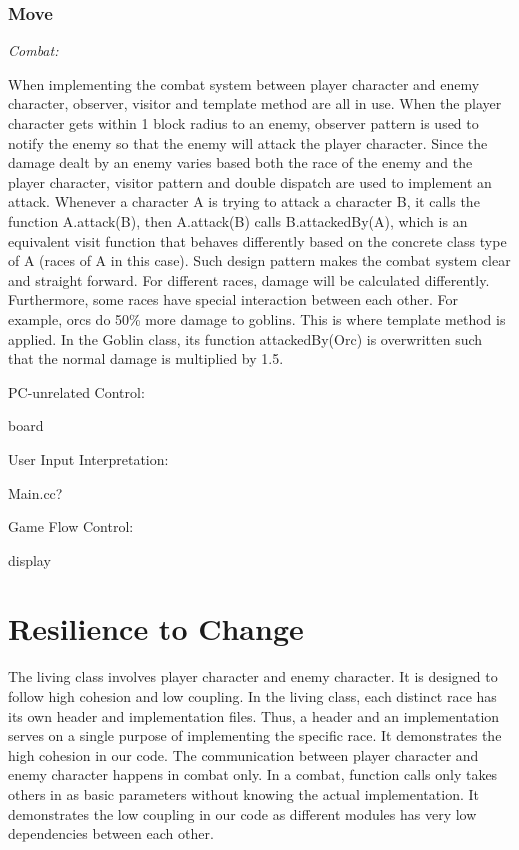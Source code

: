 \documentclass[11pt]{article}
\theoremstyle{plain} \newtheorem{theorem*}{Theorem}[subsection]
\begin{document}
\subsubsection{Move}

\textit{Combat: }

When implementing the combat system between player character and enemy
character, observer, visitor and template method are all in use. When the
player character gets within 1 block radius to an enemy, observer pattern is
used to notify the enemy so that the enemy will attack the player character.
Since the damage dealt by an enemy varies based both the race of the enemy and
the player character, visitor pattern and double dispatch are used to implement
an attack. Whenever a character A is trying to attack a character B, it calls
the function A.attack(B), then A.attack(B) calls B.attackedBy(A), which is an
equivalent visit function that behaves differently based on the concrete class
type of A (races of A in this case). Such design pattern makes the combat
system clear and straight forward. For different races, damage will be
calculated differently. Furthermore, some races have special interaction
between each other. For example, orcs do 50\% more damage to goblins. This is
where template method is applied. In the Goblin class, its function
attackedBy(Orc) is overwritten such that the normal damage is multiplied by
1.5. 

PC-unrelated Control: 

board 

User Input Interpretation: 

Main.cc? 

Game Flow Control: 

display 


\section{Resilience to Change}

The living class involves player character and enemy character. It is designed
to follow high cohesion and low coupling. In the living class, each distinct
race has its own header and implementation files. Thus, a header and an
implementation serves on a single purpose of implementing the specific race. It
demonstrates the high cohesion in our code. The communication between player
character and enemy character happens in combat only. In a combat, function
calls only takes others in as basic parameters without knowing the actual
implementation. It demonstrates the low coupling in our code as different
modules has very low dependencies between each other. 
\end{document}
